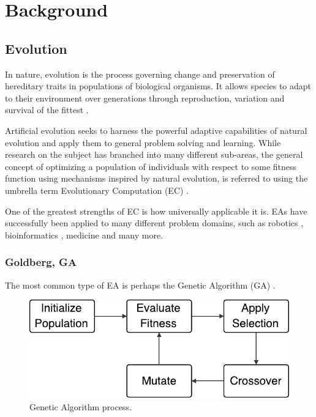 
\chapter{Background}


\section{Evolution}

In nature, evolution is the process governing change and preservation of
hereditary traits in populations of biological organisms. It allows species to
adapt to their environment over generations through reproduction, variation and
survival of the fittest \cite{Darwin1859}.

Artificial evolution seeks to harness the powerful adaptive capabilities of
natural evolution and apply them to general problem solving and learning. While
research on the subject has branched into many different sub-areas, the general
concept of optimizing a population of individuals with respect to some fitness
function using mechanisms inspired by natural evolution, is referred to using
the umbrella term Evolutionary Computation (EC) \cite{Back1997}.

One of the greatest strengths of EC is how universally applicable it is. EAs
have successfully been applied to many different problem domains, such as
robotics \cite{Floreano2000}, bioinformatics \cite{KosakovskyPond2006},
medicine \cite{Fitzgerald:2015:IAS:2739480.2754761} and many more.

\subsection{Goldberg, GA}

The most common type of EA is perhaps the Genetic Algorithm (GA) \cite{Goldberg:1989:GAS:534133}.

\begin{figure}[ht]
  \centering
  \includegraphics[width=0.5\linewidth]{fig/ga}
  \caption{Genetic Algorithm process.}
  \label{fig:ga}
\end{figure}



